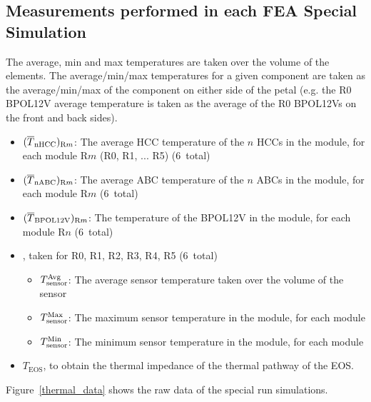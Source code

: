 \subsection{Measurements performed in each FEA Special Simulation}


The average, min and max temperatures are taken over the volume of the elements.
%
The average/min/max temperatures for a given component are taken as the average/min/max of the
component on either side of the petal (e.g. the R0 BPOL12V average temperature is taken as the average of
the R0 BPOL12Vs on the front and back sides).

\begin{itemize}
\item $(\overline{T}_\text{nHCC})_{{\text{R}m}}$: The average HCC temperature of the $n$ HCCs in the module, for each module R$m$ (R0, R1, ... R5) (6~total)
\item $(\overline{T}_\text{nABC})_{{\text{R}m}}$: The average ABC temperature of the $n$ ABCs in the module, for each module R$m$ (6~total)
\item $(\overline{T}_\text{BPOL12V})_{{\text{R}m}}$: The temperature of the BPOL12V in the module, for each module R$n$ (6~total)
\item \tsensor, taken for R0, R1, R2, R3, R4, R5 (6~total)
\begin{itemize}
  \item $T_\text{sensor}^\text{Avg}$: The average sensor temperature taken over the volume of the sensor
  \item $T_\text{sensor}^\text{Max}$: The maximum sensor temperature in the module, for each module
  \item $T_\text{sensor}^\text{Min}$: The minimum sensor temperature in the module, for each module
\end{itemize}
\item $T_\text{EOS}$, to obtain the thermal impedance of the thermal pathway of the EOS.
\end{itemize}

Figure~\ref{thermal_data} shows the raw data of the special run simulations. 

